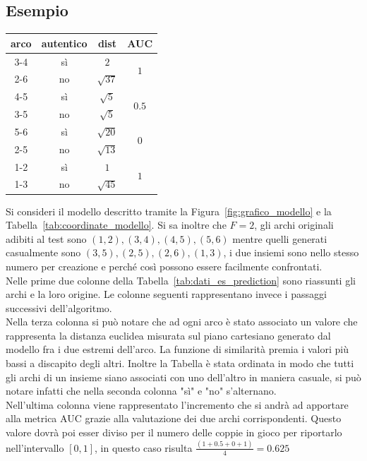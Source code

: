\subsection{Esempio}
\begin{center}
	\begin{tabular}{|c|c|c|c|}
		\hline
		arco & autentico & dist & AUC\\
		\hline
		3-4 & sì & $2$ & \multirow{2}{*}{$1$}\\
		2-6 & no & $\sqrt{37}$ & \\
		\hline
		4-5 & sì & $\sqrt{5}$ & \multirow{2}{*}{$0.5$}\\
		3-5 & no & $\sqrt{5}$ & \\
		\hline
		5-6 & sì & $\sqrt{20}$ & \multirow{2}{*}{$0$}\\
		2-5 & no & $\sqrt{13}$ & \\
		\hline
		1-2 & sì & $1$ & \multirow{2}{*}{$1$}\\
		1-3 & no & $\sqrt{45}$ & \\
		\hline
	\end{tabular}
	\label{tab:dati_es_prediction}
\end{center}
Si consideri il modello descritto tramite la Figura~\ref{fig:grafico_modello} e la Tabella~\ref{tab:coordinate_modello}. Si sa inoltre che $F=2$, gli archi originali adibiti al test sono $(1, 2), (3, 4), (4, 5), (5, 6)$ mentre quelli generati casualmente sono $(3, 5), (2, 5), (2, 6), (1, 3)$, i due insiemi sono nello stesso numero per creazione e perché così possono essere facilmente confrontati.\\
Nelle prime due colonne della Tabella~\ref{tab:dati_es_prediction} sono riassunti gli archi e la loro origine. Le colonne seguenti rappresentano invece i passaggi successivi dell'algoritmo.\\
Nella terza colonna si può notare che ad ogni arco è stato associato un valore che rappresenta la distanza euclidea misurata sul piano cartesiano generato dal modello fra i due estremi dell'arco. La funzione di similarità premia i valori più bassi a discapito degli altri. Inoltre la Tabella è stata ordinata in modo che tutti gli archi di un insieme siano associati con uno dell'altro in maniera casuale, si può notare  infatti che nella seconda colonna "sì" e "no" s'alternano.\\
Nell'ultima colonna viene rappresentato l'incremento che si andrà ad apportare alla metrica AUC grazie alla valutazione dei due archi corrispondenti. Questo valore dovrà poi esser diviso per il numero delle coppie in gioco per riportarlo nell'intervallo $[0, 1]$, in questo caso risulta $\displaystyle \frac{\left( 1+0.5+0+1 \right)}{4} = 0.625$\\
